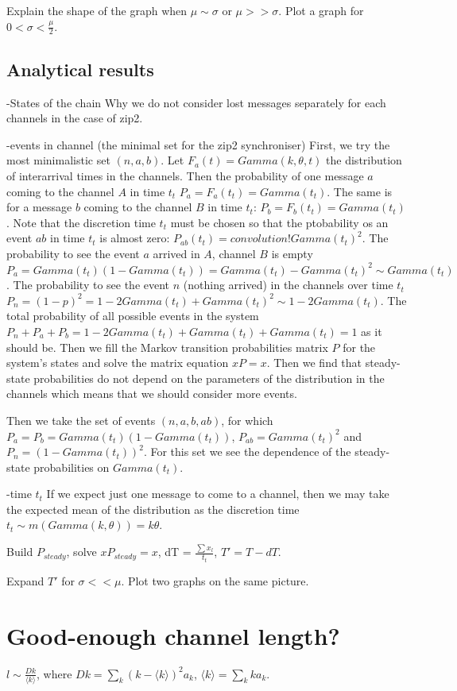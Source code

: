 Explain the shape of the graph when $\mu \sim \sigma$ or $\mu >> \sigma$.
Plot a graph for $0 < \sigma < \frac{\mu}{2}$.

  \subsection{Analytical results}
-States of the chain
Why we do not consider lost messages separately for each channels in the case of zip2. 

-events in channel (the minimal set for the zip2 synchroniser)
First, we try the most minimalistic set $(n,a,b)$. Let $F_{a}(t) = Gamma(k, \theta, t)$ the distribution of interarrival times in the channels. Then the probability of one message $a$ coming to the channel $A$ in time $t_{t}$ $P_{a} = F_{a}(t_{t}) = Gamma(t_{t})$. The same is for a message $b$ coming to the channel $B$ in time $t_{t}$: $P_{b} = F_{b}(t_{t}) = Gamma(t_{t})$. Note that the discretion time $t_{t}$ must be chosen so that the ptobability os an event $ab$ in time $t_{t}$ is almost zero: $P_{ab}(t_{t}) = convolution! Gamma(t_{t})^2$. The probability to see the event $a$ arrived in $A$, channel $B$ is empty $P_{a} = Gamma(t_{t})(1-Gamma(t_{t})) = Gamma(t_{t}) - Gamma(t_{t})^2 \sim Gamma(t_{t})$. The probability to see the event $n$ (nothing arrived) in the channels over time $t_{t}$ $P_{n} = (1-p)^2 = 1 - 2 Gamma(t_{t}) + Gamma(t_{t})^2 \sim 1 - 2 Gamma(t_{t})$. The total probability of all possible events in the system $P_{n} + P_{a} + P_{b} = 1 - 2 Gamma(t_{t}) + Gamma(t_{t}) + Gamma(t_{t}) = 1$ as it should be. Then we fill the Markov transition probabilities matrix $P$ for the system's states and solve the matrix equation $xP = x$. Then we find that steady-state probabilities do not depend on the parameters of the distribution in the channels which means that we should consider more events.

Then we take the set of events $(n,a,b,ab)$, for which $P_{a} = P_{b} = Gamma(t_{t})(1 - Gamma(t_{t}))$, $P_{ab} = Gamma(t_{t})^2$ and $P_{n} = (1 - Gamma(t_{t}))^2$. For this set we see the dependence of the steady-state probabilities on $Gamma(t_{t})$.

-time $t_t$
If we expect just one message to come to a channel, then we may take the expected mean of the distribution as the discretion time $t_{t} \sim m(Gamma(k,\theta)) = k \theta$.


Build $P_{steady}$, solve $x P_{steady} = x$, dT = $\frac{\sum{x_l}}{t_t}$, $T' = T - dT$.

Expand $T'$ for $\sigma << \mu$. Plot two graphs on the same picture.

\section{Good-enough channel length?}
$l \sim \frac{Dk}{\langle k \rangle}$, where $Dk = \sum_{k} (k - \langle k \rangle)^{2} a_{k}$, $\langle k \rangle = \sum_{k} k a_{k}$.
